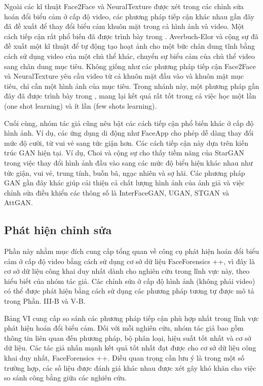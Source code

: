 \documentclass{article}
\begin{document}
Ngoài các kĩ thuật Face2Face và NeuralTexture được xét trong các chỉnh sửa hoán đổi biểu cảm ở cấp độ video, các phương pháp tiếp cận khác nhau gần đây đã đề xuất để thay đổi biểu cảm khuôn mặt trong cả hình ảnh và video. Một cách tiếp cận rất phổ biến đã được trình bày trong . Averbuch-Elor và cộng sự đã đề xuất một kĩ thuật để tự động tạo hoạt ảnh cho một bức chân dung tĩnh bằng cách sử dụng video của một chủ thể khác, chuyển sự biểu cảm của chủ thể video sang chân dung mục tiêu. Không giống như các phương pháp tiếp cận Face2Face và NeuralTexture yêu cầu video từ cả khuôn mặt đầu vào và khuôn mặt mục tiêu, chỉ cần một hình ảnh của mục tiêu. Trong nhánh này, một phương pháp gần đây đã được trình bày trong , mang lại kết quả rất tốt trong cả việc học một lần (one shot learning) và ít lần (few shots learning).

Cuối cùng, nhóm tác giả cũng nêu bật các cách tiếp cận phổ biến khác ở cấp độ hình ảnh. Ví dụ, các ứng dụng di động như FaceApp cho phép dễ dàng thay đổi mức độ cười, từ vui vẻ sang tức giận hơn. Các cách tiếp cận này dựa trên kiến trúc GAN hiện tại. Ví dụ, Choi và cộng sự  cho thấy tiềm năng của StarGAN trong việc thay đổi hình ảnh đầu vào sang các mức độ biểu hiện khác nhau như tức giận, vui vẻ, trung tính, buồn bã, ngạc nhiên và sợ hãi. Các phương pháp GAN gần đây khác giúp cải thiện cả chất lượng hình ảnh của ảnh giả và việc chỉnh sửa điều khiển các thông số là InterFaceGAN, UGAN, STGAN và AttGAN.

\subsection{Phát hiện chỉnh sửa} \label{sec:6-b-detector}

Phần này nhằm mục đích cung cấp tổng quan về công cụ phát hiện hoán đổi biểu cảm ở cấp độ video bằng cách sử dụng cơ sở dữ liệu FaceForensics ++, vì đây là cơ sở dữ liệu công khai duy nhất dành cho nghiên cứu trong lĩnh vực này, theo hiểu biết của nhóm tác giả. Các chỉnh sửa ở cấp độ hình ảnh (không phải video) có thể được phát hiện bằng cách sử dụng các phương pháp tương tự được mô tả trong Phần. III-B và V-B.

Bảng VI cung cấp so sánh các phương pháp tiếp cận phù hợp nhất trong lĩnh vực phát hiện hoán đổi biểu cảm. Đối với mỗi nghiên cứu, nhóm tác giả bao gồm thông tin liên quan đến phương pháp, bộ phân loại, hiệu suất tốt nhất và cơ sở dữ liệu. Các tác giả nhấn mạnh kết quả tốt nhất đạt được cho cơ sở dữ liệu công khai duy nhất, FaceForensics ++. Điều quan trọng cần lưu ý là trong một số trường hợp, các số liệu được đánh giá khác nhau được xét gây khó khăn cho việc so sánh công bằng giữa các nghiên cứu.
\end{document}
